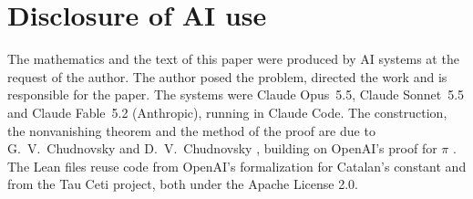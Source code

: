 \documentclass[11pt]{amsart}
\theoremstyle{definition}
\theoremstyle{remark}
\numberwithin{equation}{section}
\begin{document}
\section*{Disclosure of AI use}
The mathematics and the text of this paper were produced by AI systems at the request of the author. The author
posed the problem, directed the work and is responsible for the paper. The systems were Claude Opus~5.5, Claude
Sonnet~5.5 and Claude Fable~5.2 (Anthropic), running in Claude Code. The construction, the nonvanishing theorem
and the method of the proof are due to G.~V.~Chudnovsky and D.~V.~Chudnovsky \cite{Chudnovsky26,ChudnovskyChudnovsky26},
building on OpenAI's proof for $\pi$ \cite{OpenAIPi2026}. The Lean files reuse code from OpenAI's formalization
for Catalan's constant and from the Tau Ceti project, both under the Apache License 2.0.



\end{document}
